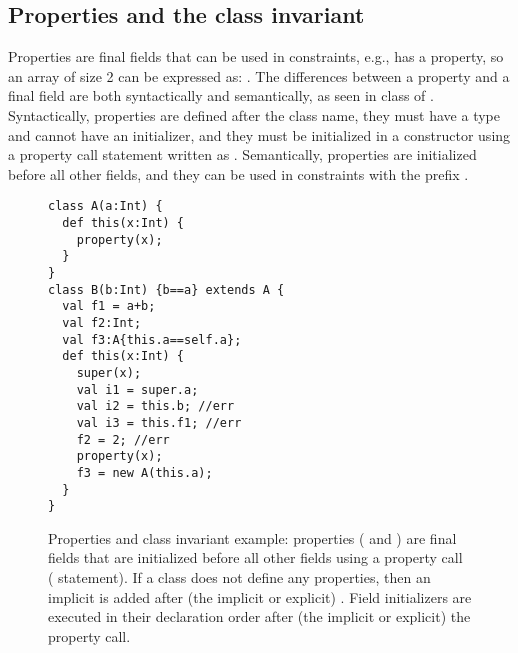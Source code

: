 \subsection{Properties and the class invariant}
Properties are final fields that can be used in constraints,
    e.g.,  has a  property,
    so an array of size 2 can be expressed as: .
The differences between a property and a final field are both syntactically and semantically,
    as seen in class  of .
Syntactically, properties are defined after the class name,
    they must have a type and cannot have an initializer,
    and they must be initialized in a constructor using a property call statement written as .
Semantically, properties are initialized before all other fields,
    and they can be used in constraints with the prefix .


\begin{figure}
\begin{lstlisting}
class A(a:Int) {
  def this(x:Int) {
    property(x);
  }
}
class B(b:Int) {b==a} extends A {
  val f1 = a+b;
  val f2:Int;
  val f3:A{this.a==self.a};
  def this(x:Int) {
    super(x);
    val i1 = super.a;
    val i2 = this.b; //err
    val i3 = this.f1; //err
    f2 = 2; //err
    property(x);
    f3 = new A(this.a);
  }
}
\end{lstlisting}
\caption{Properties and class invariant example:
        properties ( and )
        are final fields that are initialized before all other fields
        using a property call ( statement).
    {If a class does not define any properties, then
        an implicit  is added
        after (the implicit or explicit) .}
    {Field initializers are executed in their declaration order
        after (the implicit or explicit) the property call.}
    }
\label{Figure:Properties}
\end{figure}


